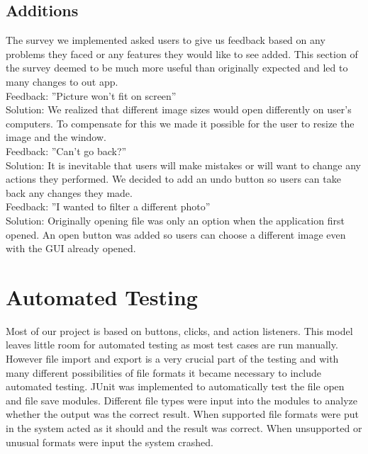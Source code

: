 \documentclass[12pt, titlepage]{article}
\begin{document}
\subsection{Additions}
The survey we implemented asked users to give us feedback based on any problems they faced or any features they would like to see added. This section of the survey deemed to be much more useful than originally expected and led to many changes to out app.\\

\noindent Feedback: ''Picture won’t fit on screen''\\
Solution: We realized that different image sizes would open differently on user’s computers. To compensate for this we made it possible for the user to resize the image and the window.\\

\noindent Feedback: ''Can’t go back?''\\
Solution: It is inevitable that users will make mistakes or will want to change any actions they performed. We decided to add an undo button so users can take back any changes they made.\\

\noindent Feedback: ''I wanted to filter a different photo''\\
Solution: Originally opening file was only an option when the application first opened. An open button was added so users can choose a different image even with the GUI already opened.\\

\section{Automated Testing}
Most of our project is based on buttons, clicks, and action listeners. This model leaves little room for automated testing as most test cases are run manually. However file import and export is a very crucial part of the testing and with many different possibilities of file formats it became necessary to include automated testing. JUnit was implemented to automatically test the file open and file save modules. Different file types were input into the modules to analyze whether the output was the correct result. When supported file formats were put in the system acted as it should and the result was correct. When unsupported or unusual formats were input the system crashed.
\end{document}
